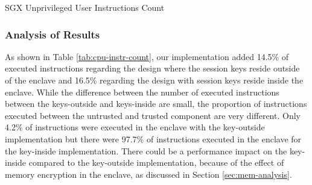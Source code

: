 \documentclass[../../../main.tex]{subfiles}
\begin{document}
\begin{table}[H]
  \caption{SGX Unprivileged User Instructions Count}
  \label{tab:sgx-enclu}
\end{table}

\subsubsection*{Analysis of Results}
As shown in Table \ref{tab:cpu-instr-count}, our implementation added 14.5\% of
executed instructions regarding the design where the session keys reside
outside of the enclave and 16.5\% regarding the design with session keys
reside inside the enclave. While the difference between the number of executed
instructions between the keys-outside and keys-inside are small, the proportion
of instructions executed between the untrusted and trusted component are very
different. Only 4.2\% of instructions were executed in the enclave with the
key-outside implementation but there were 97.7\% of instructions executed in
the enclave for the key-inside implementation. There could be a performance
impact on the key-inside compared to the key-outside implementation, because of
the effect of memory encryption in the enclave, as discussed in Section
\ref{sec:mem-analysis}.
\end{document}
